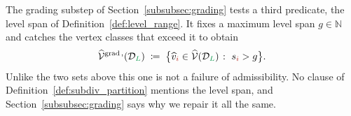 \documentclass[a4paper, 12pt]{article}
\makeatletter
\DeclareRobustCommand{\gradeClasses}[1][]{\widehat{\V}^{\mathrm{grad} \, \ifx\@empty#1\@empty\else,#1\fi}}
\newcommand{\levelSpan}[1]{s_{#1}}
\newcommand{\green}{\color{ForestGreen}}
\newcommand{\brickred}{\color{BrickRed}}
\newcommand{\V}{\mathcal{V}}
\newcommand{\vertexClass}[1]{\widehat{v}_{#1}}
\newcommand{\vertexClasses}{\widehat{\V}}
\newcommand{\coarseIdxone}{{\brickred i}}
\renewcommand{\L}{{\green L}}
\theoremstyle{definition}
\theoremstyle{plain}
\numberwithin{equation}{section}
\DeclareRobustCommand{\domseq}[1][]{\mathcal{D}\ifx\@empty#1\@empty\else_{#1}\fi}
\makeatother
\begin{document}
The grading substep of Section~\ref{subsubsec:grading} tests a third predicate, the level span of Definition~\ref{def:level_range}. It fixes a maximum level span $g \in \mathbb{N}$ and catches the vertex classes that exceed it to obtain
\begin{equation}
    \label{eq:grade_set}
    \gradeClasses(\domseq[\L]) \; \coloneq \; \big\{ \vertexClass{\coarseIdxone} \in \vertexClasses(\domseq[\L]) \; \colon \; \levelSpan{\coarseIdxone} > g \big\} .
\end{equation}
Unlike the two sets above this one is not a failure of admissibility. No clause of Definition~\ref{def:subdiv_partition} mentions the level span, and Section~\ref{subsubsec:grading} says why we repair it all the same.

\end{document}
